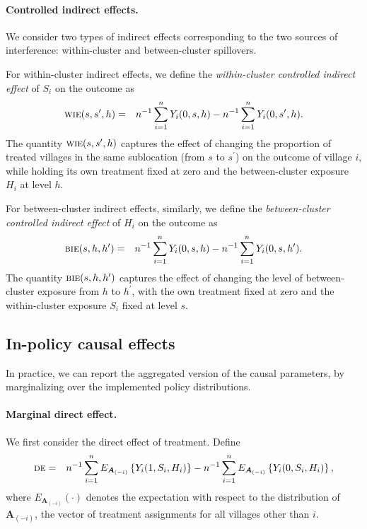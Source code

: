 \documentclass{article}
\newcommand{\bA}{\boldsymbol{A}}
\newcommand{\sumi}{\sum_{i=1}^n}
\newcommand{\de}{\textsc{de}}
\newcommand{\bie}{\textsc{bie}}
\newcommand{\wie}{\textsc{wie}}
\begin{document}
\paragraph{Controlled indirect effects.}
We consider two types of indirect effects corresponding to the two sources of interference: within-cluster and between-cluster spillovers.

For within-cluster indirect effects, we define the \textit{within-cluster controlled indirect effect} of $S_{i}$ on the outcome as
\begin{eqnarray*}
    \wie(s,s^{\prime},h) &=& n^{-1}\sumi Y_{i}(0,s,h) - n^{-1}\sumi Y_{i}(0,s^{\prime},h).
\end{eqnarray*}
The quantity $\wie(s,s^{\prime},h)$ captures the effect of changing the proportion of treated villages in the same sublocation (from $s$ to $s^{\prime}$) on the outcome of village $i$, while holding its own treatment fixed at zero and the between-cluster exposure $H_{i}$ at level $h$. 

For between-cluster indirect effects, similarly, we define the \textit{between-cluster controlled indirect effect} of $H_{i}$ on the outcome as
\begin{eqnarray*}
    \bie(s,h,h^{\prime}) &=& n^{-1}\sumi Y_{i}(0,s,h) - n^{-1}\sumi Y_{i}(0,s,h^{\prime}).
\end{eqnarray*}
The quantity $\bie(s,h,h^{\prime})$ captures the effect of changing the level of between-cluster exposure from $h$ to $h^{\prime}$, with the own treatment fixed at zero and the within-cluster exposure $S_{i}$ fixed at level $s$. 

\subsection{In-policy causal effects}
In practice, we can report the aggregated version of the causal parameters, by marginalizing over the implemented policy distributions. 
\paragraph{Marginal direct effect.}
We first consider the direct effect of treatment. Define
\begin{eqnarray*}
    \de &=& n^{-1}\sumi E_{\bA_{(-i)}}\left\{Y_{i}(1,S_{i},H_{i})\right\} - n^{-1}\sumi E_{\bA_{(-i)}}\left\{Y_{i}(0,S_{i},H_{i})\right\}, 
\end{eqnarray*}
where $E_{\bA_{(-i)}}(\cdot)$ denotes the expectation with respect to the distribution of $\bA_{(-i)}$, the vector of treatment assignments for all villages other than $i$. 
\end{document}
